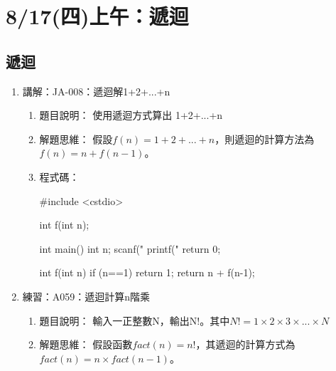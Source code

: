 
\section{8/17(四)上午：遞迴}

\subsection{遞迴}
\begin{enumerate}
	\item 講解：JA-008：遞迴解1+2+...+n
		\begin{enumerate}
			\item 題目說明：
			\subitem 使用遞迴方式算出 1+2+...+n
			
			\item 解題思維：
			\subitem 假設$f(n)=1+2+...+n$，則遞迴的計算方法為$f(n)=n+f(n-1)$。
			
			\item 程式碼：
			\begin{cppcode}
				#include <cstdio>
				
				int f(int n);
				
				int main()
				{
					int n;
					scanf("%
					printf("%
					return 0;
				}
				
				int f(int n)
				{
					if (n==1) return 1;
					return n + f(n-1);
				}
								
			\end{cppcode}
		\end{enumerate}
	
	\item 練習：A059：遞迴計算n階乘
		\begin{enumerate}
			\item 題目說明：
			\subitem 輸入一正整數N，輸出N!。其中$N! = 1\times2\times3\times...\times N$
			
			\item 解題思維：
			\subitem 假設函數$fact(n)=n! $，其遞迴的計算方式為$fact(n)=n\times fact(n-1)$。
\begin{comment}			
			\item 程式碼：
			\begin{cppcode}
				#include<iostream>
				using namespace std;
				
				int fact(int n);

				int main()
				{
					int n;
					cin >> n;
					cout << fact(n);
					return 0;
				}

				int fact(int n)
				{
					if (n) return n * fact(n-1);
					else return 1;
				}


\end{comment}
\end{enumerate}
\end{enumerate}
